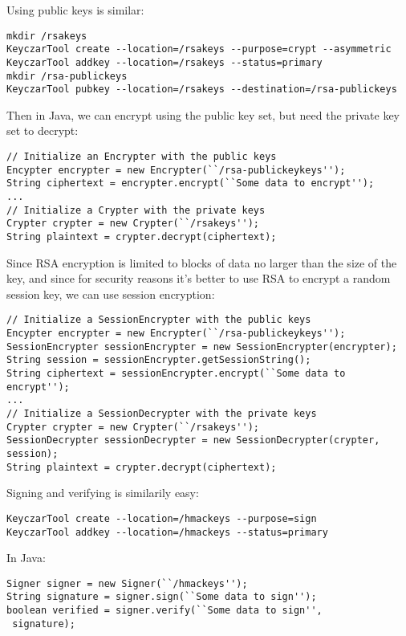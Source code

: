 \documentclass{llncs}
\begin{document}
Using public keys is similar:


\begin{verbatim}
mkdir /rsakeys
KeyczarTool create --location=/rsakeys --purpose=crypt --asymmetric
KeyczarTool addkey --location=/rsakeys --status=primary
mkdir /rsa-publickeys
KeyczarTool pubkey --location=/rsakeys --destination=/rsa-publickeys
\end{verbatim}

Then in Java, we can encrypt using the public key set, but need the
private key set to decrypt:

\begin{verbatim}
// Initialize an Encrypter with the public keys
Encypter encrypter = new Encrypter(``/rsa-publickeykeys'');
String ciphertext = encrypter.encrypt(``Some data to encrypt'');
... 
// Initialize a Crypter with the private keys
Crypter crypter = new Crypter(``/rsakeys'');
String plaintext = crypter.decrypt(ciphertext);
\end{verbatim}

Since RSA encryption is limited to blocks of data no larger than the
size of the key, and since for security reasons it's better to use RSA
to encrypt a random session key, we can use session encryption:

\begin{verbatim}
// Initialize a SessionEncrypter with the public keys
Encypter encrypter = new Encrypter(``/rsa-publickeykeys'');
SessionEncrypter sessionEncrypter = new SessionEncrypter(encrypter);
String session = sessionEncrypter.getSessionString();
String ciphertext = sessionEncrypter.encrypt(``Some data to encrypt'');
...
// Initialize a SessionDecrypter with the private keys
Crypter crypter = new Crypter(``/rsakeys'');
SessionDecrypter sessionDecrypter = new SessionDecrypter(crypter, session);
String plaintext = crypter.decrypt(ciphertext);
\end{verbatim}

Signing and verifying is similarily easy:
\begin{verbatim}
KeyczarTool create --location=/hmackeys --purpose=sign
KeyczarTool addkey --location=/hmackeys --status=primary
\end{verbatim}

In Java:
\begin{verbatim}
Signer signer = new Signer(``/hmackeys'');
String signature = signer.sign(``Some data to sign'');
boolean verified = signer.verify(``Some data to sign'',
 signature);
\end{verbatim}
\end{document}
